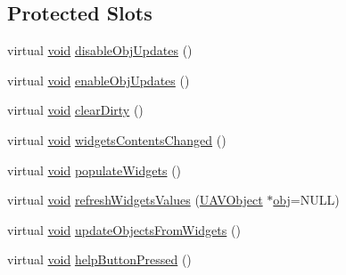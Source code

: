 \subsection*{Protected Slots}
\begin{DoxyCompactItemize}
\item 
virtual \hyperlink{group___u_a_v_objects_plugin_ga444cf2ff3f0ecbe028adce838d373f5c}{void} \hyperlink{group___u_a_v_object_widget_utils_ga32ef249bc6ebe47b9fe60812e09476da}{disable\-Obj\-Updates} ()
\item 
virtual \hyperlink{group___u_a_v_objects_plugin_ga444cf2ff3f0ecbe028adce838d373f5c}{void} \hyperlink{group___u_a_v_object_widget_utils_gafff7f205068866010a484ee95730b65b}{enable\-Obj\-Updates} ()
\item 
virtual \hyperlink{group___u_a_v_objects_plugin_ga444cf2ff3f0ecbe028adce838d373f5c}{void} \hyperlink{group___u_a_v_object_widget_utils_gae4dd854e5d93e1b268ffc473a7392493}{clear\-Dirty} ()
\item 
virtual \hyperlink{group___u_a_v_objects_plugin_ga444cf2ff3f0ecbe028adce838d373f5c}{void} \hyperlink{group___u_a_v_object_widget_utils_ga6860b8b666afa5a3254fd84ab1f9119e}{widgets\-Contents\-Changed} ()
\item 
virtual \hyperlink{group___u_a_v_objects_plugin_ga444cf2ff3f0ecbe028adce838d373f5c}{void} \hyperlink{group___u_a_v_object_widget_utils_gaa3d55f7941db619b9872b0ffdc78ebde}{populate\-Widgets} ()
\item 
virtual \hyperlink{group___u_a_v_objects_plugin_ga444cf2ff3f0ecbe028adce838d373f5c}{void} \hyperlink{group___u_a_v_object_widget_utils_ga7682451eb1e003d337c679fc8a36c6e1}{refresh\-Widgets\-Values} (\hyperlink{class_u_a_v_object}{U\-A\-V\-Object} $\ast$\hyperlink{glext_8h_a0c0d4701a6c89f4f7f0640715d27ab26}{obj}=N\-U\-L\-L)
\item 
virtual \hyperlink{group___u_a_v_objects_plugin_ga444cf2ff3f0ecbe028adce838d373f5c}{void} \hyperlink{group___u_a_v_object_widget_utils_ga4e59f88c43451ae4282077f9a9214cea}{update\-Objects\-From\-Widgets} ()
\item 
virtual \hyperlink{group___u_a_v_objects_plugin_ga444cf2ff3f0ecbe028adce838d373f5c}{void} \hyperlink{group___u_a_v_object_widget_utils_ga63ae96f50a8ed78f60d382dede4676d7}{help\-Button\-Pressed} ()
\end{DoxyCompactItemize}
